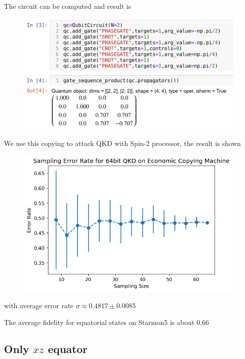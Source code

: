 \documentclass[11pt]{article}
\begin{document}
The circuit can be computed and result is 
\begin{figure}[h]
    \includegraphics[width=0.8\linewidth]{Figures/CH.png}
\end{figure}

We use this copying to attack QKD with Spin-2 processor, the result is shown
\begin{figure}[h]
    \includegraphics[width=0.8\linewidth]{Figures/economic_qkd.png}
\end{figure}
with average error rate  $\sigma\approx 0.4817\pm 0.0085$

The average fidelity for equatorial states on Starmon5 is about 0.66


\subsection{Only $xz$ equator}
\end{document}
